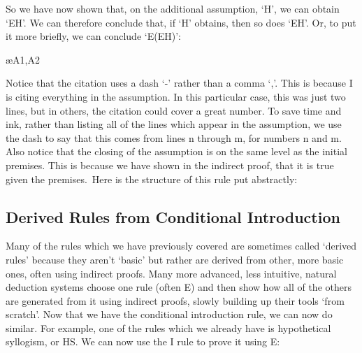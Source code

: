 So we have now shown that, on the additional assumption, `H', we can obtain `E\eand H'. We can therefore conclude that, if `H' obtains, then so does `E\eand H'. Or, to put it more briefly, we can conclude `E\eif (E\eand H)':
\begin{fitchproof}
\open
	\ae{A1,A2}
\close
{} 
\end{fitchproof}				

Notice that the citation uses a dash `-' rather than a comma `,'. This is because \eif I is citing everything in the assumption. In this particular case, this was just two lines, but in others, the citation could cover a great number. To save time and ink, rather than listing all of the lines which appear in the assumption, we use the dash to say that this comes from lines n through m, for numbers n and m. Also notice that the closing of the assumption is on the same level as the initial premises. This is because we have shown in the indirect proof, that it is true given the premises. Here is the structure of this rule put abstractly:

\subsection{Derived Rules from Conditional Introduction}

Many of the rules which we have previously covered are sometimes called `derived rules' because they aren't `basic' but rather are derived from other, more basic ones, often using indirect proofs. Many more advanced, less intuitive, natural deduction systems choose one rule (often \eif E) and then show how all of the others are generated from it using indirect proofs, slowly building up their tools `from scratch'. Now that we have the conditional introduction rule, we can now do similar. For example, one of the rules which we already have is hypothetical syllogism, or HS. We can now use the \eif I rule to prove it using \eif E:
\begin{fitchproof}
\open
\close
{} 
\end{fitchproof}		
